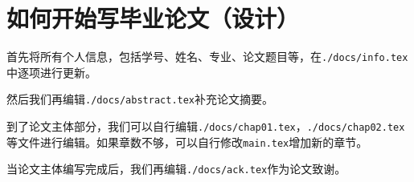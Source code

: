 \section{如何开始写毕业论文（设计）}

首先将所有个人信息，包括学号、姓名、专业、论文题目等，在\texttt{./docs/info.tex}中逐项进行更新。

然后我们再编辑\texttt{./docs/abstract.tex}补充论文摘要。

到了论文主体部分，我们可以自行编辑\texttt{./docs/chap01.tex}，\texttt{./docs/chap02.tex}等文件进行编辑。如果章数不够，可以自行修改\texttt{main.tex}增加新的章节。

当论文主体编写完成后，我们再编辑\texttt{./docs/ack.tex}作为论文致谢。


